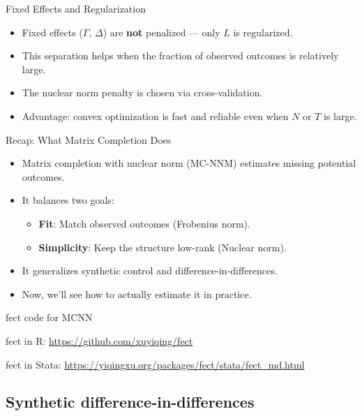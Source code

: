 \documentclass{beamer}
\begin{document}
\begin{frame}{Fixed Effects and Regularization}
\small
\begin{itemize}
\item Fixed effects ($\Gamma$, $\Delta$) are \textbf{not} penalized — only $L$ is regularized.
\item This separation helps when the fraction of observed outcomes is relatively large.
\item The nuclear norm penalty is chosen via cross-validation.
\item Advantage: convex optimization is fast and reliable even when $N$ or $T$ is large.
\end{itemize}
\end{frame}

\begin{frame}{Recap: What Matrix Completion Does}
\small
\begin{itemize}
  \item Matrix completion with nuclear norm (MC-NNM) estimates missing potential outcomes.
  \item It balances two goals:
  \begin{itemize}
    \item \textbf{Fit}: Match observed outcomes (Frobenius norm).
    \item \textbf{Simplicity}: Keep the structure low-rank (Nuclear norm).
  \end{itemize}
  \item It generalizes synthetic control and difference-in-differences.
  \item Now, we'll see how to actually estimate it in practice.
\end{itemize}
\end{frame}




\begin{frame}{fect code for MCNN}

fect in R: \url{https://github.com/xuyiqing/fect}

\bigskip

fect in Stata: \url{https://yiqingxu.org/packages/fect/stata/fect_md.html}

\end{frame}





\subsection{Synthetic difference-in-differences}
\end{document}

